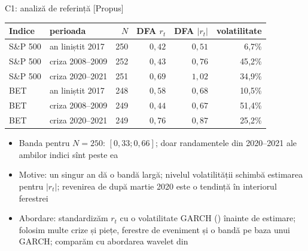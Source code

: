 \ifsolutions
\begin{frame}{C1: analiză de referință [Propus]}
\itemsize{\footnotesize}
\begin{center}
\scriptsize
\begin{tabular}{llrrrr}
\toprule
Indice & perioada & $N$ & DFA $r_t$ & DFA $|r_t|$ & volatilitate \\
\midrule
S\&P 500 & an liniștit 2017 & 250 & $0{,}42$ & $0{,}51$ & 6{,}7\% \\
S\&P 500 & criza 2008--2009 & 252 & $0{,}43$ & $0{,}76$ & 45{,}2\% \\
S\&P 500 & criza 2020--2021 & 251 & $0{,}69$ & $1{,}02$ & 34{,}9\% \\
BET & an liniștit 2017 & 248 & $0{,}58$ & $0{,}68$ & 10{,}5\% \\
BET & criza 2008--2009 & 249 & $0{,}44$ & $0{,}67$ & 51{,}4\% \\
BET & criza 2020--2021 & 249 & $0{,}76$ & $0{,}87$ & 25{,}2\% \\
\bottomrule
\end{tabular}
\end{center}
\begin{itemize}
    \item Banda pentru $N = 250$: $[0{,}33; 0{,}66]$; doar randamentele din 2020--2021 ale ambilor indici sînt peste ea
    \item Motive: un singur an dă o bandă largă; nivelul volatilității schimbă estimarea pentru $|r_t|$; revenirea de după martie 2020 este o tendință în interiorul ferestrei
    \item Abordare: standardizăm $r_t$ cu o volatilitate GARCH () înainte de estimare; folosim multe crize și piețe, ferestre de eveniment și o bandă pe baza unui GARCH; comparăm cu abordarea wavelet din 
\end{itemize}
\end{frame}
\fi

